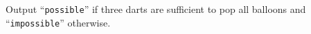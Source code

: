 
  Output ``\texttt{possible}'' if three darts are sufficient to pop all balloons and ``\texttt{impossible}'' otherwise.
